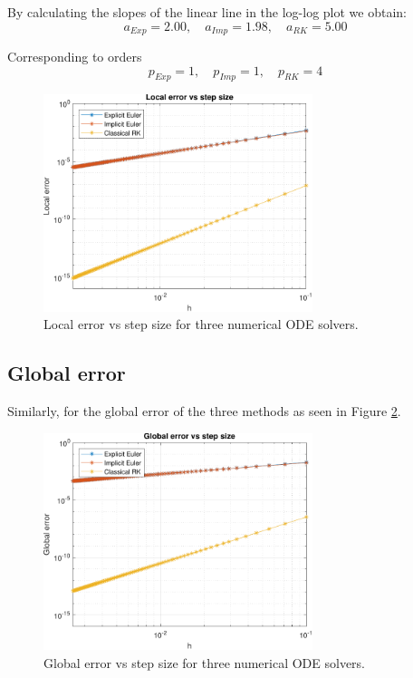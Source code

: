 By calculating the slopes of the linear line in the log-log plot we obtain:
$$
a_{Exp} = 2.00, \quad a_{Imp} = 1.98, \quad a_{RK} = 5.00
$$

Corresponding to orders
$$
p_{Exp} = 1, \quad p_{Imp} = 1, \quad p_{RK} = 4
$$


\begin{figure}[H]
    \centering
    \includegraphics[width=0.7\textwidth]{plots/1_4.pdf}
    \caption{Local error vs step size for three numerical ODE solvers.}
    \label{fig:1_4}
\end{figure}



\subsection{Global error}
Similarly, for the global error of the three methods as seen in Figure \ref{fig:1_5}.

\begin{figure}[H]
    \centering
    \includegraphics[width=0.7\textwidth]{plots/1_5.pdf}
    \caption{Global error vs step size for three numerical ODE solvers.}
    \label{fig:1_5}
\end{figure}

